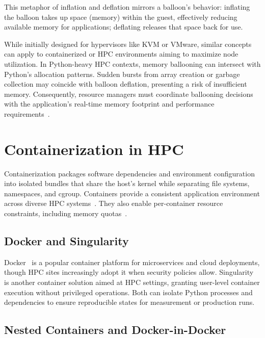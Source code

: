 This metaphor of inflation and deflation mirrors a balloon's behavior: inflating the balloon takes up space (memory) within the guest, effectively reducing available memory for applications; deflating releases that space back for use.

While initially designed for hypervisors like \ac{KVM} or VMware, similar concepts can apply to containerized or \ac{HPC} environments aiming to maximize node utilization.
In Python-heavy \ac{HPC} contexts, memory ballooning can intersect with Python's allocation patterns.
Sudden bursts from array creation or garbage collection may coincide with balloon deflation, presenting a risk of insufficient memory.
Consequently, resource managers must coordinate ballooning decisions with the application's real-time memory footprint and performance requirements~\cite{waldspurger-ballooning-2002}.


\section{Containerization in \ac{HPC}}
\label{sec:fundamentals-containerization}

Containerization packages software dependencies and environment configuration into isolated bundles that share the host's kernel while separating file systems, namespaces, and \ac{cgroup}.
Containers provide a consistent application environment across diverse \ac{HPC} systems~\cite{Boettiger2015}.
They also enable per-container resource constraints, including memory quotas~\cite{Kurtzer2017}.

\subsection{Docker and Singularity}
\label{subsec:fundamentals-docker-singularity}

Docker~\cite{Boettiger2015} is a popular container platform for microservices and cloud deployments, though \ac{HPC} sites increasingly adopt it when security policies allow.
Singularity~\cite{Kurtzer2017} is another container solution aimed at \ac{HPC} settings, granting user-level container execution without privileged operations.
Both can isolate Python processes and dependencies to ensure reproducible states for measurement or production runs.

\subsection{Nested Containers and Docker-in-Docker}
\label{subsec:fundamentals-nested-dind}

